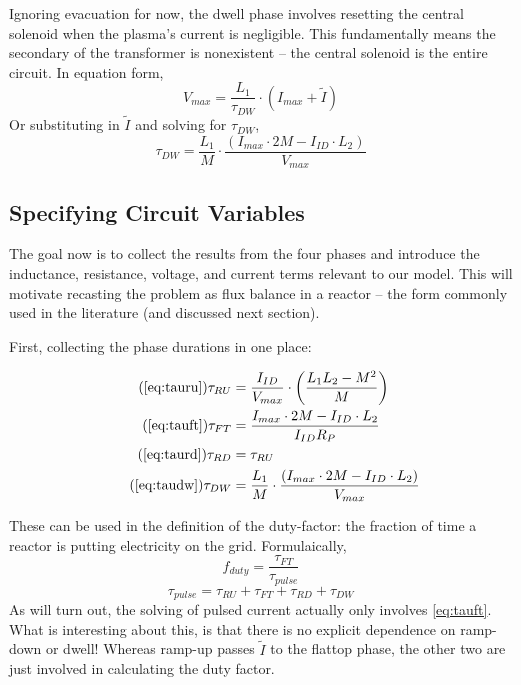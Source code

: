 Ignoring evacuation for now, the dwell phase involves resetting the central solenoid when the plasma's current is negligible. This fundamentally means the secondary of the transformer is nonexistent -- the central solenoid is the entire circuit. In equation form,
\begin{equation}
	V_{max} = \frac{L_1}{\tau_{DW}} \cdot \left( I_{max} + \tilde I \right) 
\end{equation}
Or substituting in $\tilde I$ and solving for $\tau_{DW}$,
\begin{equation}
	\label{eq:taudw}
	\tau_{DW} = \frac{L_1}{M} \cdot \frac{ \left( I_{max} \cdot 2 M - I_{ID} \cdot  L_2 \right) }{V_{max}}
\end{equation}

\subsection{Specifying Circuit Variables}

The goal now is to collect the results from the four phases and introduce the inductance, resistance, voltage, and current terms relevant to our model. This will motivate recasting the problem as flux balance in a reactor -- the form commonly used in the literature (and discussed next section).

First, collecting the phase durations in one place:

\begin{align}
	\tag{\ref{eq:tauru}}
	\tau_{RU} &= \frac{I_{ID}}{V_{max}} \cdot \left( \frac{ L_1 L_2 - M^2 }{ M } \right) \\
	\tag{\ref{eq:tauft}}
	\tau_{FT} &= \frac{ I_{max} \cdot 2 M - I_{ID} \cdot  L_2 }{I_{ID} R_P} \\
	\tag{\ref{eq:taurd}}
	\tau_{RD} &= \tau_{RU} \\
	\tag{\ref{eq:taudw}}
	\tau_{DW} &= \frac{L_1}{M} \cdot \frac{ \left( I_{max} \cdot 2 M - I_{ID} \cdot  L_2 \right) }{V_{max}}
\end{align}

These can be used in the definition of the duty-factor: the fraction of time a reactor is putting electricity on the grid. Formulaically,
\begin{equation}
	\label{eq:duty}
	f_{duty} = \frac{\tau_{FT}}{\tau_{pulse}}
\end{equation}
\begin{equation}
	\tau_{pulse} = \tau_{RU} + \tau_{FT} + \tau_{RD} + \tau_{DW}
\end{equation}
As will turn out, the solving of pulsed current actually only involves \cref{eq:tauft}. What is interesting about this, is that there is no explicit dependence on ramp-down or dwell! Whereas ramp-up passes $\tilde I$ to the flattop phase, the other two are just involved in calculating the duty factor.

